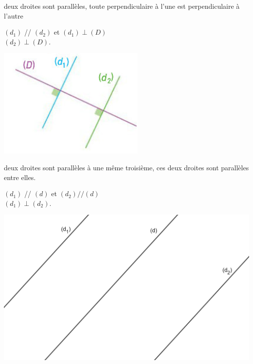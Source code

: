 \begin{myprop}
	 deux droites sont parallèles,  toute perpendiculaire à l’une est perpendiculaire à l’autre
\end{myprop}


\begin{myex}
	\begin{multicols}{2}
		 $(d_1)$ // $(d_2)$ et $(d_1) \perp (D)$\\
		 $(d_2) \perp (D)$.
		
		\includegraphics[scale=0.6]{img/para2}
	\end{multicols}
	
\end{myex}

\begin{myprop}
	 deux droites sont parallèles à une même troisième,  ces deux droites sont parallèles entre elles.
\end{myprop}

\begin{myex}
	\begin{multicols}{2}
		 $(d_1)$ // $(d)$ et $(d_2) // (d)$\\
		 $(d_1) \perp (d_2)$.
		
		\includegraphics[scale=0.1]{img/para3}
	\end{multicols}
	
\end{myex}
